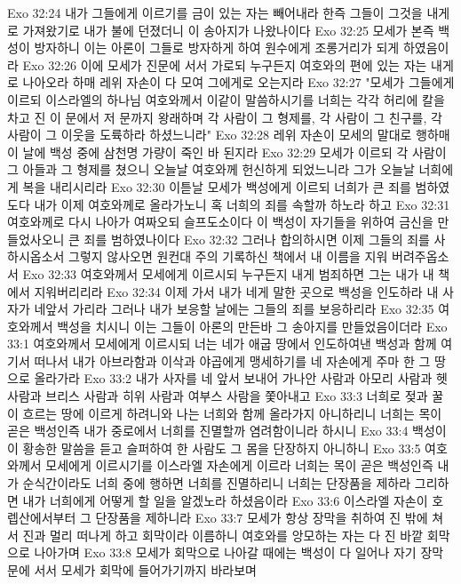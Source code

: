 Exo 32:24  내가 그들에게 이르기를 금이 있는 자는 빼어내라 한즉 그들이 그것을 내게로 가져왔기로 내가 불에 던졌더니 이 송아지가 나왔나이다
Exo 32:25  모세가 본즉 백성이 방자하니 이는 아론이 그들로 방자하게 하여 원수에게 조롱거리가 되게 하였음이라
Exo 32:26  이에 모세가 진문에 서서 가로되 누구든지 여호와의 편에 있는 자는 내게로 나아오라 하매 레위 자손이 다 모여 그에게로 오는지라
Exo 32:27  "모세가 그들에게 이르되 이스라엘의 하나님 여호와께서 이같이 말씀하시기를 너희는 각각 허리에 칼을 차고 진 이 문에서 저 문까지 왕래하며 각 사람이 그 형제를, 각 사람이 그 친구를, 각 사람이 그 이웃을 도륙하라 하셨느니라"
Exo 32:28  레위 자손이 모세의 말대로 행하매 이 날에 백성 중에 삼천명 가량이 죽인 바 된지라
Exo 32:29  모세가 이르되 각 사람이 그 아들과 그 형제를 쳤으니 오늘날 여호와께 헌신하게 되었느니라 그가 오늘날 너희에게 복을 내리시리라
Exo 32:30  이튿날 모세가 백성에게 이르되 너희가 큰 죄를 범하였도다 내가 이제 여호와께로 올라가노니 혹 너희의 죄를 속할까 하노라 하고
Exo 32:31  여호와께로 다시 나아가 여짜오되 슬프도소이다 이 백성이 자기들을 위하여 금신을 만들었사오니 큰 죄를 범하였나이다
Exo 32:32  그러나 합의하시면 이제 그들의 죄를 사하시옵소서 그렇지 않사오면 원컨대 주의 기록하신 책에서 내 이름을 지워 버려주옵소서
Exo 32:33  여호와께서 모세에게 이르시되 누구든지 내게 범죄하면 그는 내가 내 책에서 지워버리리라
Exo 32:34  이제 가서 내가 네게 말한 곳으로 백성을 인도하라 내 사자가 네앞서 가리라 그러나 내가 보응할 날에는 그들의 죄를 보응하리라
Exo 32:35  여호와께서 백성을 치시니 이는 그들이 아론의 만든바 그 송아지를 만들었음이더라
Exo 33:1  여호와께서 모세에게 이르시되 너는 네가 애굽 땅에서 인도하여낸 백성과 함께 여기서 떠나서 내가 아브라함과 이삭과 야곱에게 맹세하기를 네 자손에게 주마 한 그 땅으로 올라가라
Exo 33:2  내가 사자를 네 앞서 보내어 가나안 사람과 아모리 사람과 헷 사람과 브리스 사람과 히위 사람과 여부스 사람을 쫓아내고
Exo 33:3  너희로 젖과 꿀이 흐르는 땅에 이르게 하려니와 나는 너희와 함께 올라가지 아니하리니 너희는 목이 곧은 백성인즉 내가 중로에서 너희를 진멸할까 염려함이니라 하시니
Exo 33:4  백성이 이 황송한 말씀을 듣고 슬퍼하여 한 사람도 그 몸을 단장하지 아니하니
Exo 33:5  여호와께서 모세에게 이르시기를 이스라엘 자손에게 이르라 너희는 목이 곧은 백성인즉 내가 순식간이라도 너희 중에 행하면 너희를 진멸하리니 너희는 단장품을 제하라 그리하면 내가 너희에게 어떻게 할 일을 알겠노라 하셨음이라
Exo 33:6  이스라엘 자손이 호렙산에서부터 그 단장품을 제하니라
Exo 33:7  모세가 항상 장막을 취하여 진 밖에 쳐서 진과 멀리 떠나게 하고 회막이라 이름하니 여호와를 앙모하는 자는 다 진 바깥 회막으로 나아가며
Exo 33:8  모세가 회막으로 나아갈 때에는 백성이 다 일어나 자기 장막문에 서서 모세가 회막에 들어가기까지 바라보며
